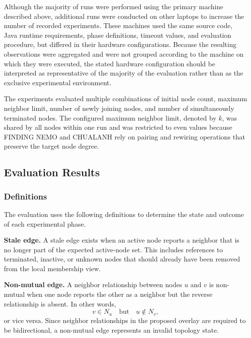 Although the majority of runs were performed using the primary machine described above, additional runs were conducted
on other laptops to increase the number of recorded experiments. These machines used the same source code, Java runtime
requirements, phase definitions, timeout values, and evaluation procedure, but differed in their hardware
configurations. Because the resulting observations were aggregated and were not grouped according to the machine on
which they were executed, the stated hardware configuration should be interpreted as representative of the majority of
the evaluation rather than as the exclusive experimental environment.

The experiments evaluated multiple combinations of initial node count, maximum neighbor limit, number of newly joining
nodes, and number of simultaneously terminated nodes. The configured maximum neighbor limit, denoted by \(k\), was
shared by all nodes within one run and was restricted to even values because FINDING NEMO and CHUALANH rely on pairing
and rewiring operations that preserve the target node degree.

\subsection{Evaluation Results}
\label{subsec:evaluation_results}

\subsubsection{Definitions}
\label{subsubsec:evaluation_definitions}

The evaluation uses the following definitions to determine the state and outcome of each experimental phase.

\textbf{Stale edge.}
A stale edge exists when an active node reports a neighbor that is no
longer part of the expected active-node set. This includes references to
terminated, inactive, or unknown nodes that should already have been
removed from the local membership view.

\textbf{Non-mutual edge.}
A neighbor relationship between nodes \(u\) and \(v\) is non-mutual when
one node reports the other as a neighbor but the reverse relationship is
absent. In other words,
\[
  v \in N_u
  \quad\text{but}\quad
  u \notin N_v,
\]
or vice versa. Since neighbor relationships in the proposed overlay are required to be bidirectional, a non-mutual edge
represents an invalid topology state.

